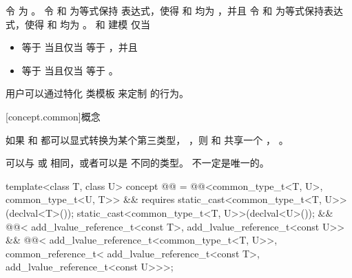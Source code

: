 \begin{itemdescr}
\pnum
令  为 。
令  和  为等式保持
表达式，使得
 和  均为 ，并且
令  和  为等式保持表达式，使得
 和  均为 。
 和  建模 
仅当
\begin{itemize}
\item {} 等于  当且仅当
   等于 ，并且
\item {} 等于  当且仅当
   等于 。
\end{itemize}

\pnum
\begin{note}
用户可以通过特化
 类模板 来定制  的行为。
\end{note}
\end{itemdescr}

[concept.common]{概念 }

\pnum
如果  和  都可以显式转换为某个第三类型，
，则  和  共享一个 ，
。
\begin{note}
 可以与  或  相同，或者可以是
不同的类型。 不一定是唯一的。
\end{note}

\begin{itemdecl}
template<class T, class U>
  concept @@ =
    @@<common_type_t<T, U>, common_type_t<U, T>> &&
    requires {
      static_cast<common_type_t<T, U>>(declval<T>());
      static_cast<common_type_t<T, U>>(declval<U>());
    } &&
    @@<
      add_lvalue_reference_t<const T>,
      add_lvalue_reference_t<const U>> &&
    @@<
      add_lvalue_reference_t<common_type_t<T, U>>,
      common_reference_t<
        add_lvalue_reference_t<const T>,
        add_lvalue_reference_t<const U>>>;
\end{itemdecl}

